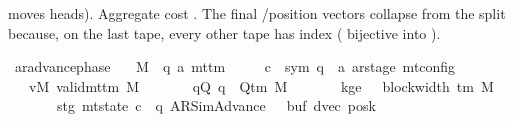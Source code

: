 \begin{isabellebody}
\begin{isamarkuptext}
  moves heads).  Aggregate cost .  The
  final /position vectors collapse from the
   split because, on the last tape, every other
  tape has index  ( bijective into
  ).%
\end{isamarkuptext}\isamarkuptrue%
\isamarkupfalse%
\ ar{\isacharunderscore}{\kern0pt}advance{\isacharunderscore}{\kern0pt}phase{\isacharcolon}{\kern0pt}\isanewline
\ \ \ M\ {\isacharcolon}{\kern0pt}{\isacharcolon}{\kern0pt}\ {\isachardoublequoteopen}{\isacharparenleft}{\kern0pt}{\isacharprime}{\kern0pt}q{\isacharcomma}{\kern0pt}\ {\isacharprime}{\kern0pt}a{\isacharparenright}{\kern0pt}\ mttm{\isachardoublequoteclose}\isanewline
\ \ \ \ \ c{}\ {\isacharcolon}{\kern0pt}{\isacharcolon}{\kern0pt}\ {\isachardoublequoteopen}{\isacharparenleft}{\kern0pt}sym{}{\isacharcomma}{\kern0pt}\ {\isacharprime}{\kern0pt}q\ {\isasymtimes}\ {\isacharprime}{\kern0pt}a\ ar{\isacharunderscore}{\kern0pt}stage{\isacharparenright}{\kern0pt}\ mt{\isacharunderscore}{\kern0pt}config{\isachardoublequoteclose}\isanewline
\ \ \ vM{\isacharcolon}{\kern0pt}\ {\isachardoublequoteopen}valid{\isacharunderscore}{\kern0pt}mttm\ M{\isachardoublequoteclose}\isanewline
\ \ \ \ \ \ \ qQ{\isacharcolon}{\kern0pt}\ {\isachardoublequoteopen}q\ {\isasymin}\ Q{\isacharunderscore}{\kern0pt}tm\ M{\isachardoublequoteclose}\isanewline
\ \ \ \ \ \ \ kge{}{\isacharcolon}{\kern0pt}\ {\isachardoublequoteopen}{}\ {\isasymle}\ block{\isacharunderscore}{\kern0pt}width\ {\isacharparenleft}{\kern0pt}{\isasymGamma}{\isacharunderscore}{\kern0pt}tm\ M{\isacharparenright}{\kern0pt}{\isachardoublequoteclose}\isanewline
\ \ \ \ \ \ \ stg{}{\isacharcolon}{\kern0pt}\ {\isachardoublequoteopen}mt{\isacharunderscore}{\kern0pt}state\ c{}\ {\isacharequal}{\kern0pt}\ {\isacharparenleft}{\kern0pt}q{\isacharcomma}{\kern0pt}\ AR{\isacharunderscore}{\kern0pt}SimAdvance{\isacharcomma}{\kern0pt}\ {}{\isacharcomma}{\kern0pt}\ {}{\isacharcomma}{\kern0pt}\ buf{}{\isacharcomma}{\kern0pt}\ dvec{\isacharcomma}{\kern0pt}\ posk{}{\isacharparenright}{\kern0pt}{\isachardoublequoteclose}\isanewline

\end{isabellebody}
